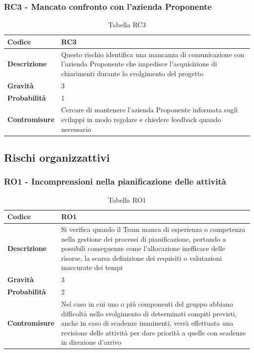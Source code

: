 \documentclass{article}
\begin{document}
    \subsubsection{RC3 - Mancato confronto con l’azienda Proponente}
    \begin{table}[h]
        \renewcommand{\arraystretch}{1.5}
        \centering
        \begin{tabular}{|p{3cm}|p{11cm}|}
            \hline
            \textbf{Codice} & RC3 \\
            \hline
            \textbf{Descrizione} & Questo rischio identifica una mancanza di comunicazione con l’azienda Proponente che impedisce l’acquisizione di chiarimenti durante lo svolgimento del progetto \\
            \hline
            \textbf{Gravità} & 3 \\
            \hline
            \textbf{Probabilità} & 1 \\
            \hline
            \textbf{Contromisure} & Cercare di mantenere l’azienda Proponente informata sugli sviluppi in modo regolare e chiedere feedback quando necessario \\
            \hline
        \end{tabular}
        \caption{Tabella RC3}
    \end{table}

    \break
    \subsection{Rischi organizzattivi}
    
    \subsubsection{RO1 - Incomprensioni nella pianificazione delle attività}
    \begin{table}[h]
        \renewcommand{\arraystretch}{1.5}
        \centering
        \begin{tabular}{|p{3cm}|p{11cm}|}
            \hline
            \textbf{Codice} & RO1 \\
            \hline
            \textbf{Descrizione} & Si verifica quando il Team manca di esperienza o competenza nella gestione dei processi di pianificazione, portando a possibili conseguenze come l’allocazione inefficace delle risorse, la scarsa definizione dei requisiti o valutazioni inaccurate dei tempi \\
            \hline
            \textbf{Gravità} & 3 \\
            \hline
            \textbf{Probabilità} & 2 \\
            \hline
            \textbf{Contromisure} & Nel caso in cui uno o più componenti del gruppo abbiano difficoltà nello svolgimento di determinati compiti previsti, anche in caso di scadenze imminenti, verrà effettuata una revisione delle attività per dare priorità a quelle con scadenze in direzione d’arrivo \\
            \hline
        \end{tabular}
        \caption{Tabella RO1}
    \end{table}
\end{document}
